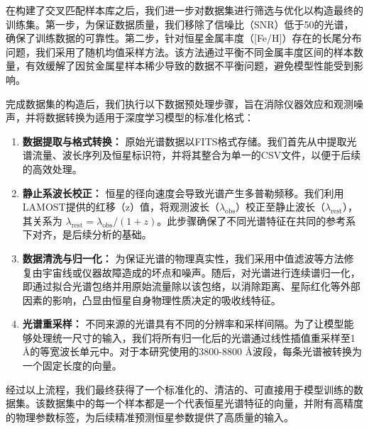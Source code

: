 在构建了交叉匹配样本库之后，我们进一步对数据集进行筛选与优化以构造最终的训练集。第一步，为保证数据质量，我们移除了信噪比（SNR）低于50的光谱，确保了训练数据的可靠性。第二步，针对恒星金属丰度（[Fe/H]）存在的长尾分布问题，我们采用了随机均值采样方法。该方法通过平衡不同金属丰度区间的样本数量，有效缓解了因贫金属星样本稀少导致的数据不平衡问题，避免模型性能受到影响。

完成数据集的构造后，我们执行以下数据预处理步骤，旨在消除仪器效应和观测噪声，并将数据转换为适用于深度学习模型的标准化格式：

\begin{enumerate}
    \item \textbf{数据提取与格式转换：} 原始光谱数据以FITS格式存储。我们首先从中提取光谱流量、波长序列及恒星标识符，并将其整合为单一的CSV文件，以便于后续的高效处理。
    \item \textbf{静止系波长校正：} 恒星的径向速度会导致光谱产生多普勒频移。我们利用LAMOST提供的红移（z）值，将观测波长（$\lambda_{\text{obs}}$）校正至静止波长（$\lambda_{\text{rest}}$），其关系为 $\lambda_{\text{rest}} = \lambda_{\text{obs}} / (1+z)$。此步骤确保了不同光谱特征在共同的参考系下对齐，是后续分析的基础。
    \item \textbf{数据清洗与归一化：} 为保证光谱的物理真实性，我们采用中值滤波等方法修复由宇宙线或仪器故障造成的坏点和噪声。随后，对光谱进行连续谱归一化，即通过拟合光谱包络并用原始流量除以该包络，以消除距离、星际红化等外部因素的影响，凸显由恒星自身物理性质决定的吸收线特征。
    \item \textbf{光谱重采样：} 不同来源的光谱具有不同的分辨率和采样间隔。为了让模型能够处理统一尺寸的输入，我们将所有归一化后的光谱通过线性插值重采样至1 Å的等宽波长单元中。对于本研究使用的3800-8800 Å波段，每条光谱被转换为一个固定长度的向量。
\end{enumerate}

经过以上流程，我们最终获得了一个标准化的、清洁的、可直接用于模型训练的数据集。该数据集中的每一个样本都是一个代表恒星光谱特征的向量，并附有高精度的物理参数标签，为后续精准预测恒星参数提供了高质量的输入。
